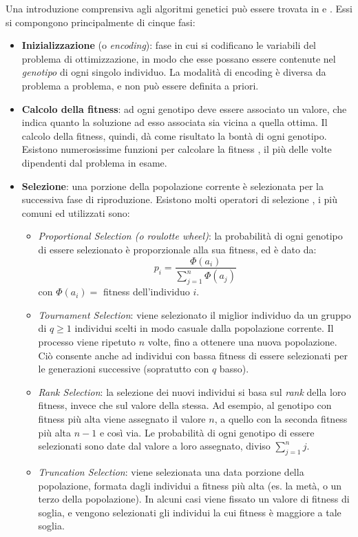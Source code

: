 \documentclass[a4paper,12pt]{article}
\begin{document}
Una introduzione comprensiva agli algoritmi genetici può essere trovata in \cite{introGA} e \cite{understandingInt}. Essi si compongono principalmente di cinque fasi: 
\begin{itemize}
	\item \textbf{Inizializzazione} (o \emph{encoding}): fase in cui si codificano le variabili del problema di ottimizzazione, in modo che esse possano essere contenute nel \emph{genotipo} di ogni singolo individuo. La modalità di encoding è diversa da problema a problema, e non può essere definita a priori. 
	\item \textbf{Calcolo della fitness}: ad ogni genotipo deve essere associato un valore, che indica quanto la soluzione ad esso associata sia vicina a quella ottima. Il calcolo della fitness, quindi, dà come risultato la bontà di ogni genotipo. Esistono numerosissime funzioni per calcolare la fitness \cite{fitnessSurvey}, il più delle volte dipendenti dal problema in esame.
	\item \textbf{Selezione}: una porzione della popolazione corrente è selezionata per la successiva fase di riproduzione. Esistono molti operatori di selezione \cite{SelectionSurvey}, i più comuni ed utilizzati sono: 
	\begin{itemize}
		\item \emph{Proportional Selection (o roulotte wheel)}: la probabilità di ogni genotipo di essere selezionato è proporzionale alla sua fitness, ed è dato da: 
		\begin{equation}
			p_i = \frac{\Phi(a_i)}{\sum_{j = 1}^{n}\Phi(a_j)}
		\end{equation}
		con $\Phi(a_i) = $ fitness dell'individuo $i$.
		\item \emph{Tournament Selection}: viene selezionato il miglior individuo da un gruppo di $q \ge 1$ individui scelti in modo casuale dalla popolazione corrente. Il processo viene ripetuto $n$ volte, fino a ottenere una nuova popolazione. Ciò consente anche ad individui con bassa fitness di essere selezionati per le generazioni successive (sopratutto con $q$ basso).
		\item \emph{Rank Selection}: la selezione dei nuovi individui si basa sul \emph{rank} della loro fitness, invece che sul valore della stessa. Ad esempio, al genotipo con fitness più alta viene assegnato il valore $n$, a quello con la seconda fitness più alta $n-1$ e così via. Le probabilità di ogni genotipo di essere selezionati sono date dal valore a loro assegnato, diviso $\sum_{j = 1}^{n}j$.
		\item \emph{Truncation Selection}: viene selezionata una data porzione della popolazione, formata dagli individui a fitness più alta (es. la metà, o un terzo della popolazione). In alcuni casi viene fissato un valore di fitness di soglia, e vengono selezionati gli individui la cui fitness è maggiore a tale soglia. 

\end{itemize}
\end{itemize}
\end{document}
